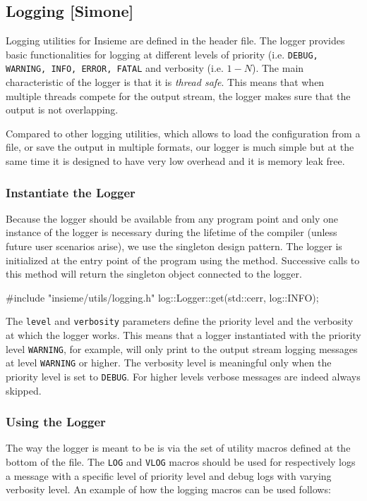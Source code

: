 \subsection{Logging [Simone]}
\label{sec:Insieme.Logging}

Logging utilities for Insieme are defined in the  header
file. The logger provides basic functionalities for logging at different levels
of priority (i.e. {\tt DEBUG, WARNING, INFO, ERROR, FATAL} and verbosity (i.e.
$1-N$). The main characteristic of the logger is that it is \emph{thread safe}. This
means that when multiple threads compete for the output stream, the logger 
makes sure that the output is not overlapping.  

Compared to other logging utilities, which allows to load the configuration from
a file, or save the output in multiple formats, our logger is much simple but at
the same time it is designed to have very low overhead and it is memory leak
free. 

\subsubsection{Instantiate the Logger}
Because the logger should be available from any program point and only one
instance of the logger is necessary during the lifetime of the compiler (unless
future user scenarios arise), we use the singleton design pattern. The logger is
initialized at the entry point of the program using the
 method. Successive calls to
this method will return the singleton object connected to the logger. 

\begin{srcCode}
#include "insieme/utils/logging.h"
log::Logger::get(std::cerr, log::INFO);
\end{srcCode}

The {\tt level} and {\tt verbosity} parameters define the priority level and the
verbosity at which the logger works. This means that a logger instantiated with
the priority level {\tt WARNING}, for example, will only print to the output stream
logging messages at level {\tt WARNING} or higher. The verbosity level is
meaningful only when the priority level is set to {\tt DEBUG}. For higher levels
verbose messages are indeed always skipped. 

\subsubsection{Using the Logger}
The way the logger is meant to be is via the set of utility macros defined at
the bottom of the  file. The {\tt LOG} and {\tt VLOG}
macros should be used for respectively logs a message with a specific level of
priority level and debug logs with varying verbosity level. An example of how
the logging macros can be used follows:


